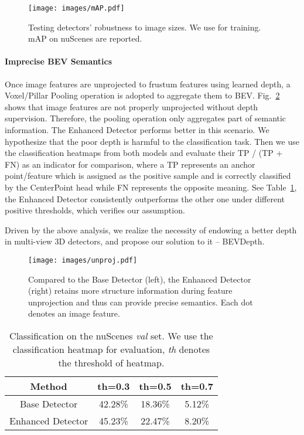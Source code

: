 \documentclass[twocolumn,letterpaper]{article}
\begin{document}
\begin{figure}[!t]
\texttt{[image: images/mAP.pdf]}
\caption{Testing detectors' robustness to image sizes. We use  for training. mAP on nuScenes are reported.}
\vspace{-.1in}
\label{sizes}
\end{figure}

\paragraph{Imprecise BEV Semantics} Once image features are unprojected to frustum features using learned depth, a Voxel/Pillar Pooling operation is adopted to aggregate them to BEV. Fig.~\ref{unproj} shows that image features are not properly unprojected without depth supervision. Therefore, the pooling operation only aggregates part of semantic information. The Enhanced Detector performs better in this scenario. We hypothesize that the poor depth is harmful to the classification task. Then we use the classification heatmaps from both models and evaluate their TP / (TP + FN) as an indicator for comparison, where a TP represents an anchor point/feature which is assigned as the positive sample and is correctly classified by the CenterPoint head while FN represents the opposite meaning. See Table~\ref{tab:cls-acc}, the Enhanced Detector consistently outperforms the other one under different positive thresholds, which verifies our assumption.


Driven by the above analysis, we realize the necessity of endowing a better depth in multi-view 3D detectors, and propose our solution to it -- BEVDepth.

\begin{figure}[!t]
\texttt{[image: images/unproj.pdf]}
\caption{Compared to the Base Detector (left), the Enhanced Detector (right) retains more structure information during feature unprojection and thus can provide precise semantics. Each dot denotes an image feature.}
\label{unproj}
\end{figure}

\begin{table}
\centering
\begin{tabular}{c|ccc} 
\toprule
\textbf{Method} &\textbf{th=0.3}   & \textbf{th=0.5} & \textbf{th=0.7} \\
\midrule
 Base Detector & 42.28\% & 18.36\% & 5.12\%     \\
 Enhanced Detector & 45.23\% & 22.47\% & 8.20\%    \\
\bottomrule
\end{tabular}
\caption{Classification on the nuScenes \emph{val} set. We use the classification heatmap for evaluation, \emph{th} denotes the threshold of heatmap.}
\label{tab:cls-acc}
\end{table}
\end{document}
